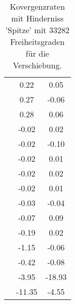 \begin{table}
\begin{tabular}{c|cc|}
\multicolumn{1}{|c|}{} & \multicolumn{1}{|c|}{      0.22} & \multicolumn{1}{|c|}{      0.05} \\ 
\multicolumn{1}{|c|}{} & \multicolumn{1}{|c|}{      0.27} & \multicolumn{1}{|c|}{     -0.06} \\ 
\multicolumn{1}{|c|}{} & \multicolumn{1}{|c|}{      0.28} & \multicolumn{1}{|c|}{      0.06} \\ 
\multicolumn{1}{|c|}{} & \multicolumn{1}{|c|}{     -0.02} & \multicolumn{1}{|c|}{      0.02} \\ 
\multicolumn{1}{|c|}{} & \multicolumn{1}{|c|}{     -0.02} & \multicolumn{1}{|c|}{     -0.10} \\ 
\multicolumn{1}{|c|}{} & \multicolumn{1}{|c|}{     -0.02} & \multicolumn{1}{|c|}{      0.01} \\ 
\multicolumn{1}{|c|}{} & \multicolumn{1}{|c|}{     -0.02} & \multicolumn{1}{|c|}{      0.02} \\ 
\multicolumn{1}{|c|}{} & \multicolumn{1}{|c|}{     -0.02} & \multicolumn{1}{|c|}{      0.01} \\ 
\multicolumn{1}{|c|}{} & \multicolumn{1}{|c|}{     -0.03} & \multicolumn{1}{|c|}{     -0.04} \\ 
\multicolumn{1}{|c|}{} & \multicolumn{1}{|c|}{     -0.07} & \multicolumn{1}{|c|}{      0.09} \\ 
\multicolumn{1}{|c|}{} & \multicolumn{1}{|c|}{     -0.19} & \multicolumn{1}{|c|}{      0.02} \\ 
\multicolumn{1}{|c|}{} & \multicolumn{1}{|c|}{     -1.15} & \multicolumn{1}{|c|}{     -0.06} \\ 
\multicolumn{1}{|c|}{} & \multicolumn{1}{|c|}{     -0.42} & \multicolumn{1}{|c|}{     -0.08} \\ 
\multicolumn{1}{|c|}{} & \multicolumn{1}{|c|}{     -3.95} & \multicolumn{1}{|c|}{    -18.93} \\ 
\multicolumn{1}{|c|}{} & \multicolumn{1}{|c|}{    -11.35} & \multicolumn{1}{|c|}{     -4.55} \\ 
\hline 
\end{tabular}\caption{Kovergenzraten mit Hinderniss 'Spitze' mit 33282 Freiheitsgraden für die Verschiebung.}\label{tab:Rate_Spitze_level6}
\end{table} 
